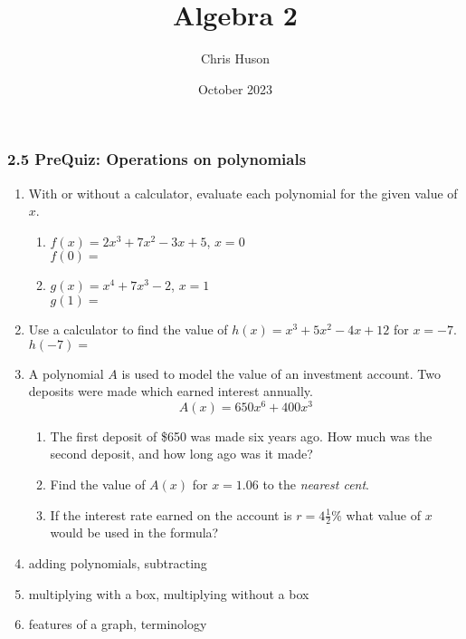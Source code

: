 \documentclass[12pt, twoside]{article}
\title{Algebra 2}
\author{Chris Huson}
\date{October 2023}
\begin{document}
\subsubsection*{2.5 PreQuiz: Operations on polynomials}
\begin{enumerate}

\item With or without a calculator, evaluate each polynomial for the given value of $x$.
\begin{multicols}{2}
    \begin{enumerate}[itemsep=1cm]
        \item $f(x)=2x^3+7x^2-3x+5$, $x=0$ \\[0.25cm] 
        $f(0) = $ \vspace{2cm}
        \item $g(x)=x^4+7x^3-2$, $x=1$ \\[0.25cm] 
        $g(1) = $ \vspace{2cm}
    \end{enumerate}
    \end{multicols}

\item Use a calculator to find the value of $h(x)=x^3+5x^2-4x+12$ for $x=-7$. \\[0.25cm] 
$h(-7) = $ \vspace{2cm}

\item A polynomial $A$ is used to model the value of an investment account. Two deposits were made which earned interest annually.  $$A(x)=650x^6+400x^3$$ 
\begin{enumerate}[itemsep=1cm]
    \item The first deposit of \$650 was made six years ago. How much was the second deposit, and how long ago was it made? \vspace{2cm}
    \item Find the value of $A(x)$ for $x = 1.06$ to the \emph{nearest cent}. \vspace{2cm}
    \item If the interest rate earned on the account is $r = 4 \frac{1}{2}\%$ what value of $x$ would be used in the formula? \vspace{2cm}
\end{enumerate}

\newpage
\item adding polynomials, subtracting
\item multiplying with a box, multiplying without a box
\item features of a graph, terminology

\end{enumerate}
\end{document}
